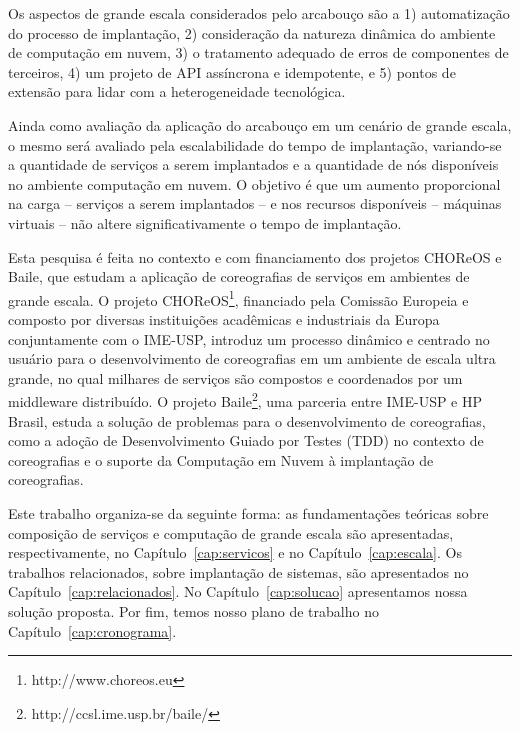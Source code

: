 Os aspectos de grande escala considerados pelo arcabouço são a 1) automatização do processo de implantação, 2) consideração da natureza dinâmica do ambiente de computação em nuvem, 3) o tratamento adequado de erros de componentes de terceiros, 4) um projeto de API assíncrona e idempotente, e 5) pontos de extensão para lidar com a heterogeneidade tecnológica.

Ainda como avaliação da aplicação do arcabouço em um cenário de grande escala, o mesmo será avaliado pela escalabilidade do tempo de implantação, variando-se a quantidade de serviços a serem implantados e a quantidade de nós disponíveis no ambiente computação em nuvem. O objetivo é que um aumento proporcional na carga -- serviços a serem implantados -- e nos recursos disponíveis -- máquinas virtuais -- não altere significativamente o tempo de implantação.

Esta pesquisa é feita no contexto e com financiamento dos projetos CHOReOS e Baile, que estudam a aplicação de coreografias de serviços em ambientes de grande escala. O projeto CHOReOS\footnote{http://www.choreos.eu}, financiado pela Comissão Europeia e composto por diversas instituições acadêmicas e industriais da Europa conjuntamente com o IME-USP, introduz um processo dinâmico e centrado no usuário para o desenvolvimento de coreografias em um ambiente de escala ultra grande, no qual milhares de serviços são compostos e coordenados por um middleware distribuído. O projeto Baile\footnote{http://ccsl.ime.usp.br/baile/}, uma parceria entre IME-USP e HP Brasil, estuda a solução de problemas para o desenvolvimento de coreografias, como a adoção de Desenvolvimento Guiado por Testes (TDD) no contexto de coreografias e o suporte da Computação em Nuvem à implantação de coreografias.


Este trabalho organiza-se da seguinte forma: as fundamentações teóricas sobre composição de serviços e computação de grande escala são apresentadas, respectivamente, no Capítulo~\ref{cap:servicos} e no Capítulo~\ref{cap:escala}. Os trabalhos relacionados, sobre implantação de sistemas, são apresentados no Capítulo~\ref{cap:relacionados}. No Capítulo~\ref{cap:solucao} apresentamos nossa solução proposta. Por fim, temos nosso plano de trabalho no Capítulo~\ref{cap:cronograma}. 


